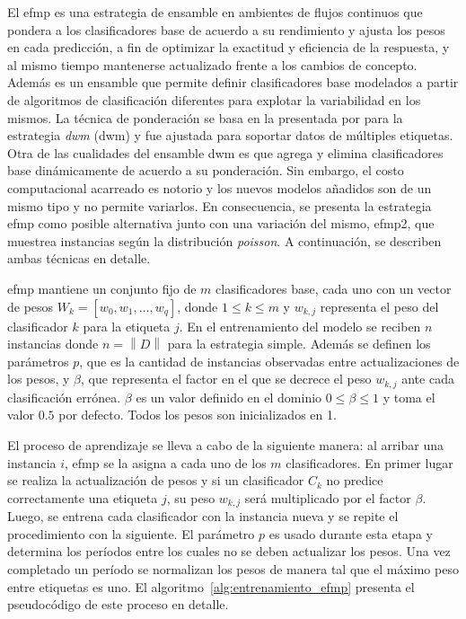 El \acrfull{efmp} es una estrategia de ensamble en ambientes de flujos continuos
que pondera a los clasificadores base de acuerdo a su rendimiento y ajusta los
pesos en cada predicción, a fin de optimizar la exactitud y eficiencia de la
respuesta, y al mismo tiempo mantenerse actualizado frente a los cambios de
concepto. Además es un ensamble que permite definir clasificadores base
modelados a partir de algoritmos de clasificación diferentes para explotar la
variabilidad en los mismos. La técnica de ponderación se basa en la presentada
por \citeauthor{kolter_dynamic_2007} para la estrategia \textit{\acrlong{dwm}}
(\acrshort{dwm}) \cite{kolter_dynamic_2007} y fue ajustada para soportar datos
de múltiples etiquetas. Otra de las cualidades del ensamble \acrshort{dwm} es
que agrega y elimina clasificadores base dinámicamente de acuerdo a su
ponderación. Sin embargo, el costo computacional acarreado es notorio y los
nuevos modelos añadidos son de un mismo tipo y no permite variarlos.  En
consecuencia, se presenta la estrategia \acrshort{efmp} como posible alternativa
junto con una variación del mismo, \acrshort{efmp2}, que muestrea instancias
según la distribución \textit{poisson}. A continuación, se describen ambas
técnicas en detalle.

\acrshort{efmp} mantiene un conjunto fijo de $m$ clasificadores base, cada uno
con un vector de pesos $W_{k} = [w_{0}, w_{1}, \dots, w_{q}]$, donde $1 \leq k
	\leq m$ y $w_{k,j}$ representa el peso del clasificador $k$ para la etiqueta
$j$. En el entrenamiento del modelo se reciben $n$ instancias donde
$n=\left\|D\right\|$ para la estrategia simple. Además se definen los parámetros
$p$, que es la cantidad de instancias observadas entre actualizaciones de los
pesos, y $\beta$, que representa el factor en el que se decrece el peso
$w_{k,j}$ ante cada clasificación errónea. $\beta$ es un valor definido en el
dominio $0 \leq \beta \leq 1$ y toma el valor $0.5$ por defecto. Todos los pesos
son inicializados en 1.

El proceso de aprendizaje se lleva a cabo de la siguiente manera: al arribar una
instancia $i$, \acrshort{efmp} se la asigna a cada uno de los $m$
clasificadores. En primer lugar se realiza la actualización de pesos y si un
clasificador $C_{k}$ no predice correctamente una etiqueta $j$, su peso
$w_{k,j}$ será multiplicado por el factor $\beta$. Luego, se entrena cada
clasificador con la instancia nueva y se repite el procedimiento con la
siguiente. El parámetro $p$ es usado durante esta etapa y determina los períodos
entre los cuales no se deben actualizar los pesos. Una vez completado un período
se normalizan los pesos de manera tal que el máximo peso entre etiquetas es uno.
El algoritmo~\ref{alg:entrenamiento_efmp} presenta el pseudocódigo de este
proceso en detalle.

